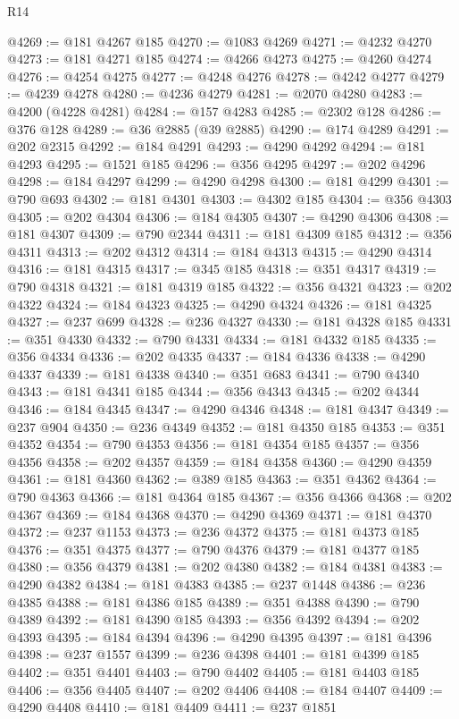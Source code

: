 \begin{lexlean}{R14}
\begin{coremodule}
@4269 := @181 @4267 @185
@4270 := @1083 @4269
@4271 := @4232 @4270
@4273 := @181 @4271 @185
@4274 := @4266 @4273
@4275 := @4260 @4274
@4276 := @4254 @4275
@4277 := @4248 @4276
@4278 := @4242 @4277
@4279 := @4239 @4278
@4280 := @4236 @4279
@4281 := @2070 @4280
@4283 := @4200 (@4228 @4281)
@4284 := @157 @4283
@4285 := @2302 @128
@4286 := @376 @128
@4289 := @36 @2885 (@39 @2885)
@4290 := @174 @4289
@4291 := @202 @2315
@4292 := @184 @4291
@4293 := @4290 @4292
@4294 := @181 @4293
@4295 := @1521 @185
@4296 := @356 @4295
@4297 := @202 @4296
@4298 := @184 @4297
@4299 := @4290 @4298
@4300 := @181 @4299
@4301 := @790 @693
@4302 := @181 @4301
@4303 := @4302 @185
@4304 := @356 @4303
@4305 := @202 @4304
@4306 := @184 @4305
@4307 := @4290 @4306
@4308 := @181 @4307
@4309 := @790 @2344
@4311 := @181 @4309 @185
@4312 := @356 @4311
@4313 := @202 @4312
@4314 := @184 @4313
@4315 := @4290 @4314
@4316 := @181 @4315
@4317 := @345 @185
@4318 := @351 @4317
@4319 := @790 @4318
@4321 := @181 @4319 @185
@4322 := @356 @4321
@4323 := @202 @4322
@4324 := @184 @4323
@4325 := @4290 @4324
@4326 := @181 @4325
@4327 := @237 @699
@4328 := @236 @4327
@4330 := @181 @4328 @185
@4331 := @351 @4330
@4332 := @790 @4331
@4334 := @181 @4332 @185
@4335 := @356 @4334
@4336 := @202 @4335
@4337 := @184 @4336
@4338 := @4290 @4337
@4339 := @181 @4338
@4340 := @351 @683
@4341 := @790 @4340
@4343 := @181 @4341 @185
@4344 := @356 @4343
@4345 := @202 @4344
@4346 := @184 @4345
@4347 := @4290 @4346
@4348 := @181 @4347
@4349 := @237 @904
@4350 := @236 @4349
@4352 := @181 @4350 @185
@4353 := @351 @4352
@4354 := @790 @4353
@4356 := @181 @4354 @185
@4357 := @356 @4356
@4358 := @202 @4357
@4359 := @184 @4358
@4360 := @4290 @4359
@4361 := @181 @4360
@4362 := @389 @185
@4363 := @351 @4362
@4364 := @790 @4363
@4366 := @181 @4364 @185
@4367 := @356 @4366
@4368 := @202 @4367
@4369 := @184 @4368
@4370 := @4290 @4369
@4371 := @181 @4370
@4372 := @237 @1153
@4373 := @236 @4372
@4375 := @181 @4373 @185
@4376 := @351 @4375
@4377 := @790 @4376
@4379 := @181 @4377 @185
@4380 := @356 @4379
@4381 := @202 @4380
@4382 := @184 @4381
@4383 := @4290 @4382
@4384 := @181 @4383
@4385 := @237 @1448
@4386 := @236 @4385
@4388 := @181 @4386 @185
@4389 := @351 @4388
@4390 := @790 @4389
@4392 := @181 @4390 @185
@4393 := @356 @4392
@4394 := @202 @4393
@4395 := @184 @4394
@4396 := @4290 @4395
@4397 := @181 @4396
@4398 := @237 @1557
@4399 := @236 @4398
@4401 := @181 @4399 @185
@4402 := @351 @4401
@4403 := @790 @4402
@4405 := @181 @4403 @185
@4406 := @356 @4405
@4407 := @202 @4406
@4408 := @184 @4407
@4409 := @4290 @4408
@4410 := @181 @4409
@4411 := @237 @1851

\end{coremodule}
\end{lexlean}
